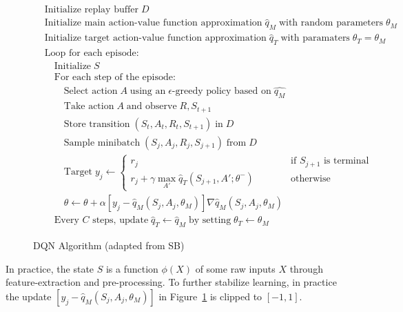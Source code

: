 \begin{figure}
\small
\begin{tcolorbox}[colback=code]
\vspace{-\baselineskip}
\begin{align*}
& \text{Initialize replay buffer}\;D \\
& \text{Initialize main action-value function approximation}\;\hat{q}_M\;\text{with random parameters}\;\theta_M \\
& \text{Initialize target action-value function approximation}\;\hat{q}_T\;\text{with paramaters}\;\theta_T=\theta_M \\
& \text{Loop for each episode:}\\
& \quad \text{Initialize}\;S \\
& \quad \text{For each step of the episode:} \\
& \quad \quad \text{Select action}\; A \; \text{using an} \; \text{$\epsilon$-greedy policy based on}\; \hat{q_M}\\
& \quad \quad \text{Take action} \; A \; \text{and observe}\;R, S_{t+1} \\
& \quad \quad \text{Store transition} \; (S_t , A_t , R_t , S_{t+1} ) \; \text{in} \; D \\
& \quad \quad \text{Sample minibatch} \; (S_j , A_j , R_j , S_{j+1} ) \; \text{from} \; D \\
& \quad \quad \text{Target}\;y_j \leftarrow \begin{cases} r_j & \qquad \quad \text{if $S_{j+1}$ is terminal} \\
r_j + \gamma \operatorname*{max}_{A'} \hat{q}_T(S_{j+1}, A'; \theta^-) & \qquad \quad \text{otherwise}\end{cases} \\
& \quad \quad \theta \leftarrow \theta + \alpha [y_j - \hat{q}_M (S_j, A_j, \theta_M)] \nabla \hat{q}_M(S_j, A_j, \theta_M) \hspace{1in} \\
& \quad \text{Every $C$ steps, update}\; \hat{q}_T \leftarrow \hat{q}_M\;\text{by setting}\; \theta_T \leftarrow \theta_M
\end{align*}
\end{tcolorbox}
\caption{DQN Algorithm (adapted from SB)}
\label{fig:dqn}
\end{figure}

In practice, the state $S$ is a function $\phi(X)$ of some raw inputs $X$ through feature-extraction and pre-processing. To further stabilize learning, in practice the update $[y_j - \hat{q}_M (S_j, A_j, \theta_M)]$ in Figure~\ref{fig:dqn} is clipped to $[-1, 1]$.

